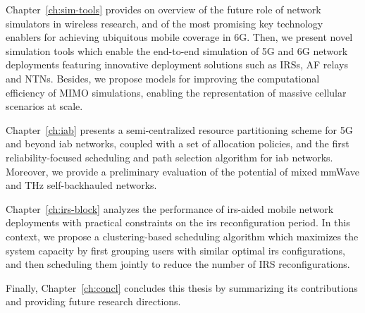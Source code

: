 Chapter~\ref{ch:sim-tools} provides on overview of the future role of network simulators in wireless research, and of the most promising key technology enablers for achieving ubiquitous mobile coverage in 6G. Then, we present novel simulation tools which enable the end-to-end simulation of 5G and 6G network deployments featuring innovative deployment solutions such as IRSs, AF relays and NTNs. Besides, we propose models for improving the computational efficiency of MIMO simulations, enabling the representation of massive cellular scenarios at scale.

Chapter~\ref{ch:iab} presents a semi-centralized resource partitioning scheme for 5G and beyond \gls{iab} networks, coupled with a set of allocation policies, and the first reliability-focused scheduling and path selection algorithm for \gls{iab} networks. Moreover, we provide a preliminary evaluation of the potential of mixed mmWave and THz self-backhauled networks.

Chapter~\ref{ch:irs-block} analyzes the performance of \gls{irs}-aided mobile network deployments with practical constraints on the \gls{irs} reconfiguration period. 
In this context, we propose a clustering-based scheduling algorithm which maximizes the system capacity by first grouping users with similar optimal \gls{irs} configurations, and then scheduling them jointly to reduce the number of IRS reconfigurations.

Finally, Chapter~\ref{ch:concl} concludes this thesis by summarizing its contributions and providing future research directions.
